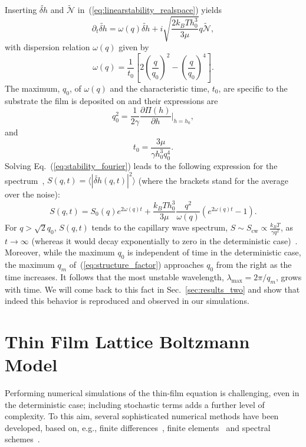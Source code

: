 Inserting $\tilde{\delta h}$ and $\tilde{\mathcal{N}}$ in~(\ref{eq:linearstability_realspace}) yields
\begin{equation}\label{eq:stability_fourier}
    \partial_t \tilde{\delta h} = \omega(q)\tilde{\delta h} +i\sqrt{\frac{2k_BTh_0^3}{3\mu}}q\tilde{\mathcal{N}},
\end{equation}
with dispersion relation $\omega(q)$ given by
\begin{equation}\label{eq:dispersion}
    \omega(q) = \frac{1}{t_0}\left[2\left(\frac{q}{q_0}\right)^2 - \left(\frac{q}{q_0}\right)^4\right].
\end{equation}
The maximum, $q_0$, of $\omega(q)$ and the characteristic time, $t_0$, are specific to the substrate the film is deposited on and their expressions are~\cite{fetzerThermalNoiseInfluences2007}
\begin{equation}\label{eq:q0}
    q_0^2 = \frac{1}{2\gamma}\frac{\partial \Pi(h)}{\partial h}\bigg\rvert_{h=h_0},
\end{equation}
and
\begin{equation}\label{eq:t0}
    t_0 = \frac{3\mu}{\gamma h_0^3 q_0^4}.
\end{equation}
Solving Eq.~(\ref{eq:stability_fourier}) leads to the following expression for the spectrum~\cite{zhangMolecularSimulationThin2019,meckeThermalFluctuationsThin2005},
$S(q,t) = \langle |\tilde{\delta h}(q,t)|^2\rangle$ (where the brackets stand for the average over the noise):
\begin{equation}\label{eq:structure_factor}
    S(q,t) = S_0(q)e^{2\omega(q)t} + \frac{k_BTh_0^3}{3\mu}\frac{q^2}{\omega(q)}(e^{2\omega(q)t} - 1).
\end{equation}
For $q>\sqrt{2}q_0$, $S(q,t)$ tends to the capillary wave spectrum, 
$S \sim S_{\text{cw}} \propto \frac{k_BT}{\gamma q^2}$, as $t \rightarrow \infty$ (whereas it would decay exponentially to zero in the deterministic case)~\cite{fetzerThermalNoiseInfluences2007,meckeThermalFluctuationsThin2005}.
Moreover, while the maximum $q_0$ is independent of time in the deterministic case, the maximum $q_m$ of~(\ref{eq:structure_factor}) approaches $q_0$ from the right as the time increases.
It follows that the most unstable wavelength, $\lambda_{\text{max}} = 2\pi/q_m$, grows with time.
We will come back to this fact in Sec.~\ref{sec:results_two} and show that indeed this behavior is reproduced and observed in our simulations.

\section{Thin Film Lattice Boltzmann Model}\label{sec:num_method}
Performing numerical simulations of the thin-film equation is challenging, even in the deterministic case; including stochastic terms adds a further level of complexity.
To this aim, several sophisticated numerical methods have been developed, based on, e.g., finite differences~\cite{diezGlobalModelsMoving2000}, finite elements~\cite{grunThinFilmFlowInfluenced2006} and spectral schemes~\cite{duran-olivenciaInstabilityRuptureFluctuations2019}. 

